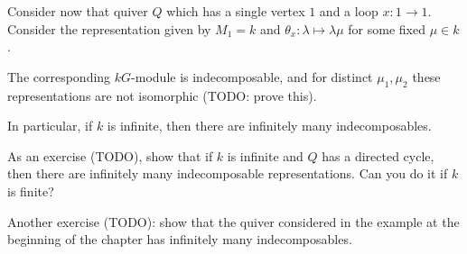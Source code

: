 Consider now that quiver $Q$ which has a single vertex $1$ and a loop $x\colon 1\to 1$.
Consider the representation given by $M_1 = k$ and $\theta_x\colon \lambda\mapsto \lambda\mu$
for some fixed $\mu \in k$.

The corresponding $kG$-module is indecomposable, and for distinct $\mu_1, \mu_2$
these representations are not isomorphic (TODO: prove this).

In particular, if $k$ is infinite, then there are infinitely many
indecomposables.

As an exercise (TODO), show that if $k$ is infinite and
$Q$ has a directed cycle, then there are
infinitely many indecomposable representations. Can you do it if $k$ is finite?

Another exercise (TODO): show that the quiver considered in the example at the
beginning of the chapter has infinitely many indecomposables.
